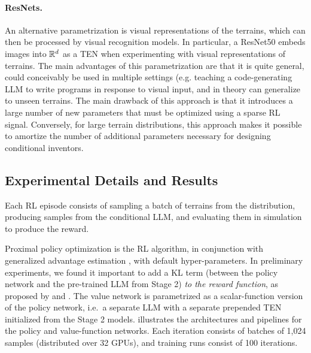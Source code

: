 \documentclass{article}
\begin{document}
\paragraph{ResNets.}
An alternative parametrization is visual representations of the terrains, which can then be processed by visual recognition models. 
In particular, a ResNet50 \citep{he:arxiv15} embeds images into ${\mathbb{R}}^d$ as a TEN when experimenting with visual representations of terrains.
The main advantages of this parametrization are that it is quite general, could conceivably be used in multiple settings (e.g. teaching a code-generating LLM to write programs in response to visual input, and in theory can generalize to unseen terrains.
The main drawback of this approach is that it introduces a large number of new parameters that must be optimized using a sparse RL signal.
Conversely, for large terrain distributions, this approach makes it possible to amortize 
the number of additional parameters necessary for designing conditional inventors.



\subsection{Experimental Details and Results}
\label{sec:conditional-rl-experiments}

Each RL episode consists of sampling a batch of terrains from the distribution, producing  samples %
from the conditional LLM, and evaluating them %
in simulation to produce the reward. 

Proximal policy optimization \citep[PPO;][]{schulman:ppo} is the RL algorithm, in conjunction with generalized advantage estimation \citep[GAE;][]{schulman2015high}, with default hyper-parameters.
In preliminary experiments, we found it important to add a KL term (between the policy network and the pre-trained LLM from Stage 2) \emph{to the reward function}, as proposed by \citet{christiano2017deep} and \citet{stiennon2020learning}. The value network is parametrized as a scalar-function version of the policy network, i.e.\ a separate LLM with a separate prepended TEN initialized from the Stage 2 models.
 illustrates the architectures and pipelines for the policy and value-function networks. Each iteration consists of batches of 1{,}024 samples (distributed over 32 GPUs), and training runs consist of 100 iterations. 


\end{document}

